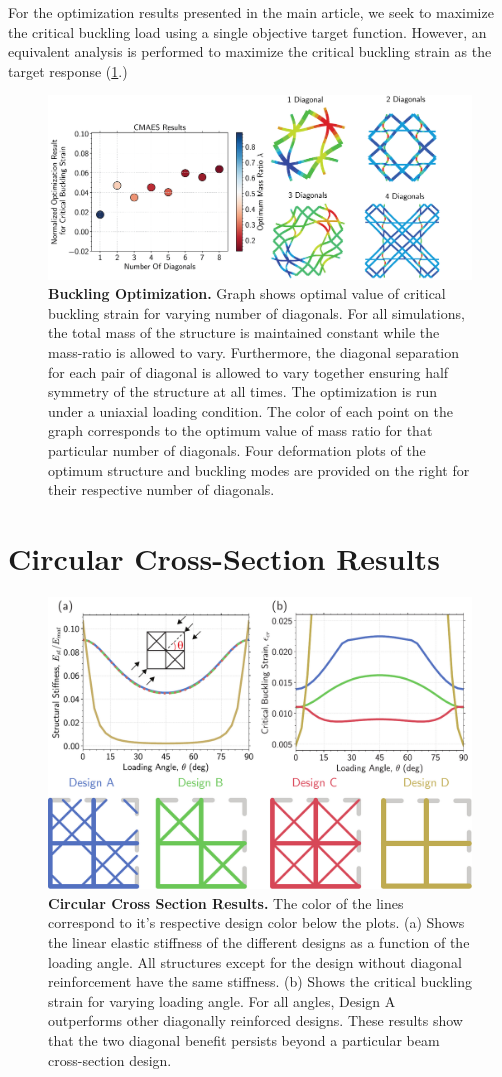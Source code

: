 \documentclass[10pt,twoside]{fernandes_supp}
\begin{document}
For the optimization results presented in the main article, we seek to maximize the critical buckling load using a single objective target function. However, an equivalent analysis is performed to maximize the critical buckling strain as the target response (\cref{BucklingOptimization}.) 

\begin{figure}[H]
    \centering
    \includegraphics[width=0.9\linewidth]{SFig6.png}
    \caption{{\bf Buckling Optimization.} Graph shows optimal value of critical buckling strain for varying number of diagonals. For all simulations, the total mass of the structure is maintained constant while the mass-ratio is allowed to vary. Furthermore, the diagonal separation for each pair of diagonal is allowed to vary together ensuring half symmetry of the structure at all times. The optimization is run under a uniaxial loading condition. The color of each point on the graph corresponds to the optimum value of mass ratio for that particular number of diagonals. Four deformation plots of the optimum structure and buckling modes are provided on the right for their respective number of diagonals.}
    \label{BucklingOptimization}
\end{figure}

\section{Circular Cross-Section Results}
\begin{figure}[H]
	\centering
	\includegraphics[width=0.6\linewidth]{SFig7.pdf}
	\caption{{\bf Circular Cross Section Results.} The color of the lines correspond to it's respective design color below the plots. (a) Shows the linear elastic stiffness of the different designs as a function of the loading angle. All structures except for the design without diagonal reinforcement have the same stiffness. (b) Shows the critical buckling strain for varying loading angle. For all angles, Design A outperforms other diagonally reinforced designs. These results show that the two diagonal benefit persists beyond a particular beam cross-section design.}
	
	\label{CircularCrossSection}
\end{figure}
\end{document}
